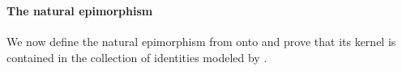 \begin{code}
\AgdaSymbol{\}}\<%
\\
%
\\[\AgdaEmptyExtraSkip]%
%
\>[1]\AgdaSpace{}%
\AgdaSymbol{:}\AgdaSpace{}%
\AgdaSpace{}%
\AgdaSpace{}%
\AgdaSpace{}%
\AgdaSpace{}%
\AgdaSymbol{(}\AgdaSpace{}%
\AgdaSymbol{)}\AgdaSpace{}%
\AgdaSymbol{\AgdaUnderscore{}}\<%
\\
%
\>[1]\AgdaSpace{}%
\AgdaOperator{\AgdaFunction{𝔽[}}\AgdaSpace{}%
\AgdaSpace{}%
\AgdaOperator{\AgdaFunction{]}}\AgdaSpace{}%
\AgdaSymbol{=}\AgdaSpace{}%
\AgdaSpace{}%
\<%
\\
%
\>[1]\AgdaSpace{}%
\AgdaOperator{\AgdaFunction{𝔽[}}\AgdaSpace{}%
\AgdaSpace{}%
\AgdaOperator{\AgdaFunction{]}}\AgdaSpace{}%
\AgdaSymbol{=}\AgdaSpace{}%
\AgdaSpace{}%
\<%
\\
\>[1][@{}l@{\AgdaIndent{0}}]%
\>[2]\AgdaSpace{}%
\AgdaSymbol{:}\AgdaSpace{}%
\AgdaSpace{}%
\AgdaSymbol{\{}\AgdaSymbol{\}}\AgdaSpace{}%
\AgdaSpace{}%
\AgdaSpace{}%
\AgdaSpace{}%
\AgdaSpace{}%
\AgdaSymbol{(}\AgdaSpace{}%
\AgdaSymbol{)}\AgdaSpace{}%
\AgdaSpace{}%
\AgdaSpace{}%
\<%
\\
%
\>[2]\AgdaSpace{}%
\AgdaSpace{}%
\AgdaSymbol{(}\AgdaSpace{}%
\AgdaOperator{\AgdaInductiveConstructor{,}}\AgdaSpace{}%
\AgdaSymbol{)}%
\>[32]\AgdaSymbol{=}\AgdaSpace{}%
\AgdaSpace{}%
\AgdaSpace{}%
\<%
\\
%
\>[2]\AgdaSpace{}%
\AgdaSpace{}%
\AgdaSymbol{(}\AgdaSpace{}%
\AgdaOperator{\AgdaInductiveConstructor{,}}\AgdaSpace{}%
\AgdaSymbol{)}%
\>[32]\AgdaSymbol{=}\AgdaSpace{}%
\AgdaSpace{}%
\<%
\end{code}

\paragraph*{The natural epimorphism} %
We now define the natural epimorphism from  onto  %
and prove that its kernel is contained in the collection of identities modeled
by  . %

